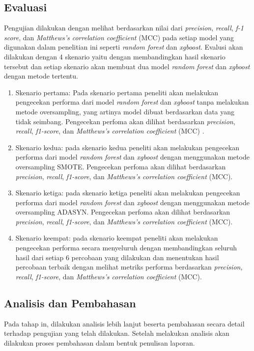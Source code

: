 \subsection{Evaluasi}
Pengujian dilakukan dengan melihat berdasarkan nilai dari  \textit{precision}, \textit{recall}, \textit{f-1 score}, dan \textit{Matthews’s correlation coefficient} (MCC) pada setiap model yang digunakan dalam penelitian ini seperti \textit{random forest} dan \textit{xgboost}. Evalusi akan dilakukan dengan 4 skenario yaitu dengan membandingkan  hasil skenario tersebut dan setiap skenario akan membuat dua model \textit{random forest} dan \textit{xgboost} dengan metode tertentu.
\begin{enumerate}[noitemsep]
    \item Skenario pertama: Pada skenario pertama peneliti akan melakukan pengecekan performa dari model \textit{random forest} dan \textit{xgboost} tanpa melakukan metode oversampling, yang artinya model dibuat berdasarkan data yang tidak seimbang. Pengecekan perfoma akan dilihat berdasarkan \textit{precision}, \textit{recall},     \textit{f1-score}, dan \textit{Matthews’s correlation coefficient} (MCC) .
    \item Skenario kedua: pada skenario kedua peneliti akan melakukan pengecekan performa dari model \textit{random forest} dan \textit{xgboost} dengan menggunakan metode oversampling SMOTE. Pengecekan perfoma akan dilihat berdasarkan \textit{precision}, \textit{recall},    \textit{f1-score}, dan \textit{Matthews’s correlation coefficient} (MCC).
    \item Skenario ketiga: pada skenario ketiga peneliti akan melakukan pengecekan performa dari model \textit{random forest} dan \textit{xgboost} dengan menggunakan metode oversampling ADASYN. Pengecekan perfoma akan dilihat berdasarkan \textit{precision}, \textit{recall}, \textit{f1-score}, dan \textit{Matthews’s correlation coefficient} (MCC).
    \item Skenario keempat: pada skenario keempat peneliti akan melakukan pengecekan performa secara menyeluruh dengan membandingkan seluruh hasil dari setiap 6 percobaan yang dilakukan dan menentukan hasil percobaan terbaik dengan melihat metriks performa berdasarkan \textit{precision}, \textit{recall}, \textit{f1-score}, dan \textit{Matthews’s correlation coefficient} (MCC).
\end{enumerate}
\subsection{Analisis dan Pembahasan}
Pada tahap in, dilakukan analisis lebih lanjut beserta pembahasan secara detail terhadap pengujian yang telah dilakukan. Setelah melakukan analisis akan dilakukan proses pembahasan dalam bentuk penulisan laporan.

